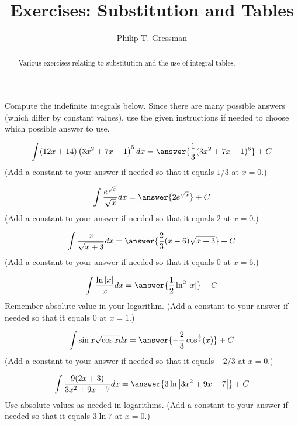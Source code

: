 \documentclass{ximera}
\title{Exercises: Substitution and Tables}
\author{Philip T. Gressman}
\begin{document}
\begin{abstract}
Various exercises relating to substitution and the use of integral tables.
\end{abstract}
\maketitle

Compute the indefinite integrals below. Since there are many possible answers (which differ by constant values), use the given instructions if needed to choose which possible answer to use.

\begin{exercise}%
\[ \int (12 x+14) \left(3 x^2+7 x-1\right)^5 dx = \answer{\frac{1}{3}(3 x^2+7 x-1)^6}+C \]
(Add a constant to your answer if needed so that it equals $1/3$ at $x = 0$.)
%
%
\end{exercise}

\begin{exercise}%
\[ \int \frac{e^{\sqrt{x}}}{\sqrt{x}} dx  = \answer{2 e^{\sqrt{x}}}+C \]
(Add a constant to your answer if needed so that it equals $2$ at $x = 0$.)
%
%
\end{exercise}

\begin{exercise}%
\[ \int \frac{x}{\sqrt{x+3}} dx  = \answer{\frac{2}{3} (x-6) \sqrt{x+3}}+C\]
(Add a constant to your answer if needed so that it equals $0$ at $x=6$.)
%
%
\end{exercise}

\begin{exercise}%
\[ \int \frac{\ln |x|}{x} dx  = \answer{\frac{1}{2}\ln^2 |x|}+C\]
Remember absolute value in your logarithm.
(Add a constant to your answer if needed so that it equals $0$ at $x = 1$.)
%
%
\end{exercise}

\begin{exercise}%
\[ \int \sin x \sqrt{\cos x} dx =  \answer{-\frac{2}{3} \cos ^{\frac{3}{2}}(x)}+C\]
(Add a constant to your answer if needed so that it equals $-2/3$ at $x = 0$.)
%
%
\end{exercise}

\begin{exercise}%
\[  \int \frac{9 (2 x+3)}{3 x^2+9 x+7} dx = \answer{3 \ln \left|3 x^2+9 x+7\right|}+C \]
Use absolute values as needed in logarithms. (Add a constant to your answer if needed so that it equals $3 \ln 7$ at $x = 0$.)
%
%
\end{exercise}
\end{document}
